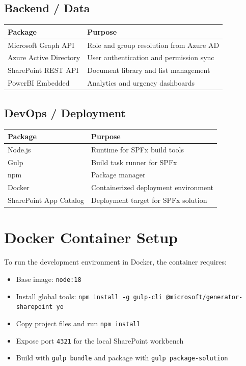 \documentclass[12pt]{article}
\begin{document}
\subsection{Backend / Data}
\begin{longtable}{|p{2.5in}|p{3.5in}|}
\hline
\textbf{Package} & \textbf{Purpose} \\ \hline
Microsoft Graph API & Role and group resolution from Azure AD \\ \hline
Azure Active Directory & User authentication and permission sync \\ \hline
SharePoint REST API & Document library and list management \\ \hline
PowerBI Embedded & Analytics and urgency dashboards \\ \hline
\end{longtable}

\subsection{DevOps / Deployment}
\begin{longtable}{|p{2.5in}|p{3.5in}|}
\hline
\textbf{Package} & \textbf{Purpose} \\ \hline
Node.js & Runtime for SPFx build tools \\ \hline
Gulp & Build task runner for SPFx \\ \hline
npm & Package manager \\ \hline
Docker & Containerized deployment environment \\ \hline
SharePoint App Catalog & Deployment target for SPFx solution \\ \hline
\end{longtable}

\section{Docker Container Setup}
To run the development environment in Docker, the container requires:
\begin{itemize}
    \item Base image: \texttt{node:18}
    \item Install global tools: \texttt{npm install -g gulp-cli @microsoft/generator-sharepoint yo}
    \item Copy project files and run \texttt{npm install}
    \item Expose port \texttt{4321} for the local SharePoint workbench
    \item Build with \texttt{gulp bundle} and package with \texttt{gulp package-solution}
\end{itemize}
\end{document}
